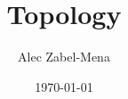 \documentclass[12pt, twoside]{book}
\title{Topology}
\author{Alec Zabel-Mena}
\date{\today}
\theoremstyle{plain}
\theoremstyle{plain} %
\theoremstyle{definition}
\theoremstyle{remark}
\begin{document}
\maketitle


%
%

\nocite{*}



\end{document}
